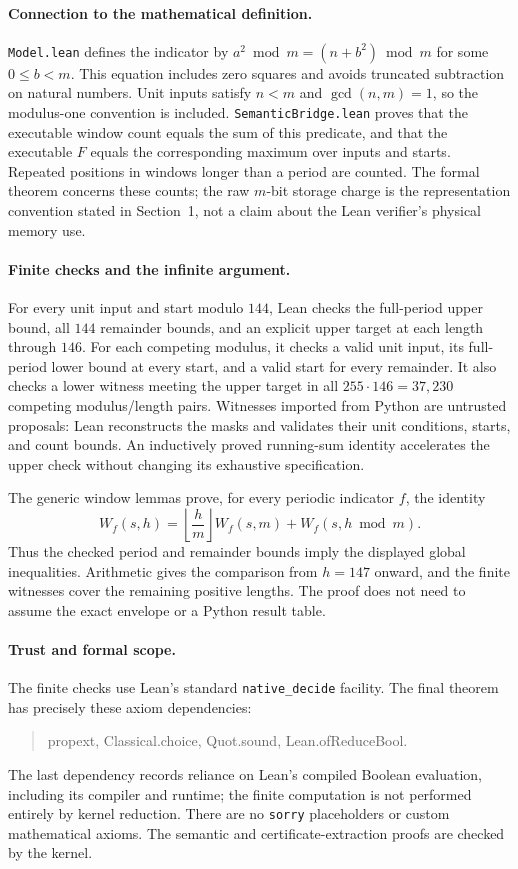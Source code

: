 \documentclass[11pt]{article}
\begin{document}
\paragraph{Connection to the mathematical definition.}
\texttt{Model.lean} defines the indicator by
$a^2\bmod m=(n+b^2)\bmod m$ for some $0\le b<m$.
This equation includes zero squares and avoids truncated subtraction on
natural numbers. Unit inputs satisfy $n<m$ and $\gcd(n,m)=1$, so the
modulus-one convention is included. \texttt{SemanticBridge.lean} proves
that the executable window count equals the sum of this predicate, and
that the executable $F$ equals the corresponding maximum over inputs and
starts. Repeated positions in windows longer than a period are counted.
The formal theorem concerns these counts; the raw $m$-bit storage charge
is the representation convention stated in Section~1, not a claim about
the Lean verifier's physical memory use.

\paragraph{Finite checks and the infinite argument.}
For every unit input and start modulo $144$, Lean checks the full-period
upper bound, all $144$ remainder bounds, and an explicit upper target at
each length through $146$. For each competing modulus, it checks a valid
unit input, its full-period lower bound at every start, and a valid start
for every remainder. It also checks a lower witness meeting the upper
target in all $255\cdot146=37{,}230$ competing modulus/length pairs.
Witnesses imported from Python are untrusted proposals: Lean reconstructs
the masks and validates their unit conditions, starts, and count bounds.
An inductively proved running-sum identity accelerates the upper check
without changing its exhaustive specification.

The generic window lemmas prove, for every periodic indicator $f$, the
identity
\[
 W_f(s,h)=\left\lfloor\frac hm\right\rfloor W_f(s,m)
          +W_f(s,h\bmod m).
\]
Thus the checked period and remainder bounds imply the displayed global
inequalities. Arithmetic gives the comparison from $h=147$ onward, and
the finite witnesses cover the remaining positive lengths. The proof
does not need to assume the exact envelope or a Python result table.

\paragraph{Trust and formal scope.}
The finite checks use Lean's standard \texttt{native\_decide} facility.
The final theorem has precisely these axiom dependencies:
\begin{quote}\small\ttfamily
propext, Classical.choice, Quot.sound, Lean.ofReduceBool.
\end{quote}
The last dependency records reliance on
Lean's compiled Boolean evaluation, including its compiler and runtime;
the finite computation is not performed entirely by kernel reduction.
There are no \texttt{sorry} placeholders or custom mathematical axioms.
The semantic and certificate-extraction proofs are checked by the kernel.
\end{document}
